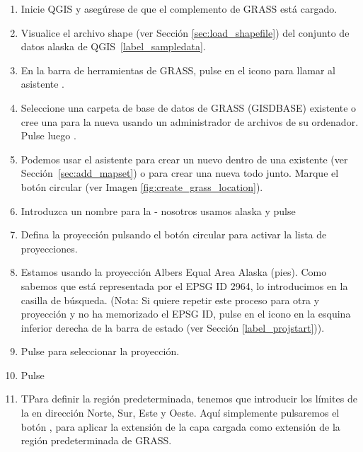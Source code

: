 \begin{enumerate}
  \item Inicie QGIS y asegúrese de que el complemento de GRASS está cargado.
  \item Visualice el archivo shape  (ver Sección
  \ref{sec:load_shapefile}) del conjunto de datos alaska de QGIS~\ref{label_sampledata}.
  \item En la barra de herramientas de GRASS, pulse en el icono  para llamar al asistente .
  \item Seleccione una carpeta de base de datos de GRASS (GISDBASE) existente 
   o cree una para la nueva  usando un administrador de archivos 
  de su ordenador. Pulse luego . 
  \item Podemos usar el asistente para crear un nuevo  dentro de una 
    existente (ver Sección~\ref{sec:add_mapset}) o para crear 
  una nueva  todo junto. Marque el botón circular
   (ver Imagen \ref{fig:create_grass_location}).
  \item Introduzca un nombre para la  - nosotros usamos alaska y pulse 
  \item Defina la proyección pulsando el botón circular
   para activar la lista de proyecciones.
  \item Estamos usando la proyección Albers Equal Area Alaska (pies). Como sabemos que está representada por el EPSG ID 2964, lo introducimos 
  en la casilla de búsqueda. (Nota: Si quiere repetir este proceso para otra 
   y proyección y no ha memorizado el EPSG ID, 
  pulse en el icono
   en la esquina inferior derecha de la barra de estado (ver Sección \ref{label_projstart})).
  \item Pulse  para seleccionar la proyección.
  \item Pulse  
  \item TPara definir la región predeterminada, tenemos que introducir los límites de la  en dirección Norte, Sur, Este y Oeste. 
  Aquí simplemente pulsaremos el botón , para aplicar la extensión de la  
  capa cargada  como extensión de la región predeterminada de GRASS.

\end{enumerate}
